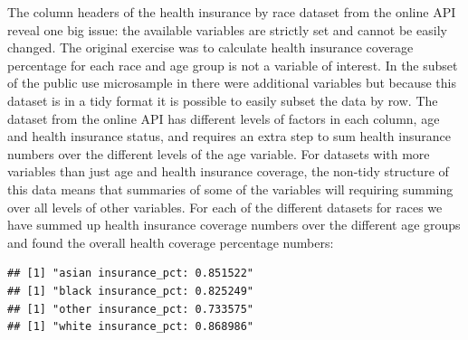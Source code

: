 \documentclass{article}\usepackage[]{graphicx}\usepackage[]{color}
\makeatletter
\newenvironment{kframe}{%
 \def\at@end@of@kframe{}%
 \ifinner\ifhmode%
  \def\at@end@of@kframe{\end{minipage}}%
  \begin{minipage}{\columnwidth}%
 \fi\fi%
 \def\FrameCommand##1{\hskip\@totalleftmargin \hskip-\fboxsep
 \colorbox{shadecolor}{##1}\hskip-\fboxsep
     \hskip-\linewidth \hskip-\@totalleftmargin \hskip\columnwidth}%
 \MakeFramed {\advance\hsize-\width
   \@totalleftmargin\z@ \linewidth\hsize
   \@setminipage}}%
 {\par\unskip\endMakeFramed%
 \at@end@of@kframe}
\newenvironment{knitrout}{}{} %
\makeatother
\begin{document}
The column headers of the health insurance by race dataset from the online API reveal one big issue: the available variables are strictly set and cannot be easily changed.  The original exercise was to calculate health insurance coverage percentage for each race and age group is not a variable of interest.  In the subset of the public use microsample in \citet{stangl:2013} there were additional variables but because this dataset is in a tidy format it is possible to easily subset the data by row.  The dataset from the online API has different levels of factors in each column, age and health insurance status, and requires an extra step to sum health insurance numbers over the different levels of the age variable.  For datasets with more variables than just age and health insurance coverage, the non-tidy structure of this data means that summaries of some of the variables will requiring summing over all levels of other variables.  For each of the different datasets for races we have summed up health insurance coverage numbers over the different age groups and found the overall health coverage percentage numbers:
\begin{knitrout}
\color{fgcolor}\begin{kframe}
\begin{verbatim}
## [1] "asian insurance_pct: 0.851522"
## [1] "black insurance_pct: 0.825249"
## [1] "other insurance_pct: 0.733575"
## [1] "white insurance_pct: 0.868986"
\end{verbatim}
\end{kframe}
\end{knitrout}
\end{document}
